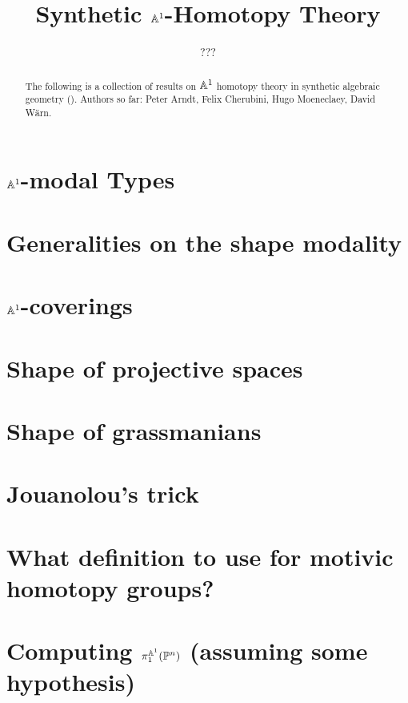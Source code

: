 \documentclass{../util/zariski}
\title{Synthetic $\mathbb{A}^1$-Homotopy Theory}
\author{???}
\begin{document}
\maketitle


\begin{abstract}
  The following is a collection of results on $\mathbb{A}^1$ homotopy theory in synthetic algebraic geometry (\cite{draft}).
  Authors so far: Peter Arndt, Felix Cherubini, Hugo Moeneclaey, David Wärn. 
\end{abstract}

\tableofcontents

\section[A1-modal types]{$\mathbb{A}^1$-modal Types}


%

\section{Generalities on the shape modality}


\section{$\mathbb{A}^1$-coverings}


\section{Shape of projective spaces}


\section{Shape of grassmanians}


\section{Jouanolou's trick}


\section{What definition to use for motivic homotopy groups?}


\section{Computing $\pi_1^{\mathbb{A}^1}(\mathbb{P}^n)$ (assuming some hypothesis)}


\printindex

\printbibliography
\end{document}
